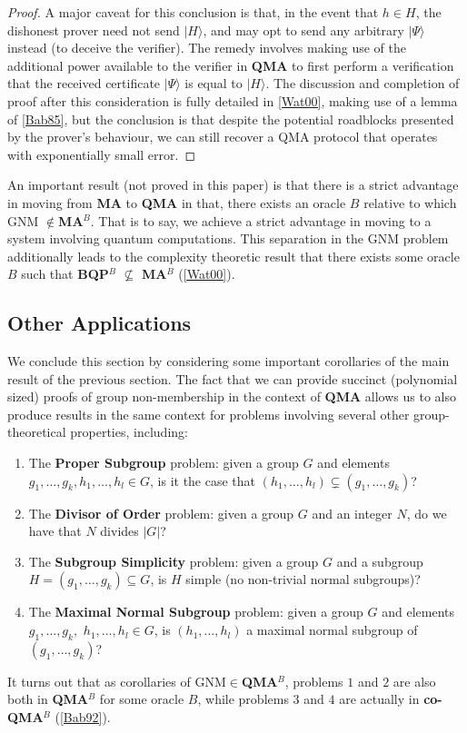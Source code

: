 \documentclass[12pt]{article}
\numberwithin{thm}{section}
\numberwithin{defn}{section}
\numberwithin{prop}{section}
\numberwithin{rmk}{section}
\newcommand{\ket}[1]{\vert #1 \rangle}
\begin{document}
\begin{proof}
		A major caveat for this conclusion is that, in the event that $h\in H$, the dishonest prover need not send $\ket{H}$, and may opt to send any arbitrary $\ket{\Psi}$ instead (to deceive the verifier). The remedy involves making use of the additional power available to the verifier in \textbf{QMA} to first perform a verification that the received certificate $\ket{\Psi}$ is equal to $\ket{H}$. The discussion and completion of proof after this consideration is fully detailed in \hyperref[wat00]{[Wat00]}, making use of a lemma of \hyperref[bab85]{[Bab85]}, but the conclusion is that despite the potential roadblocks presented by the prover's behaviour, we can still recover a QMA protocol that operates with exponentially small error.
	\end{proof}
	An important result (not proved in this paper) is that there is a strict advantage in moving from \textbf{MA} to \textbf{QMA} in that, there exists an oracle $B$ relative to which GNM $\notin$\textbf{MA$^B$}. That is to say, we achieve a strict advantage in moving to a system involving quantum computations. This separation in the GNM problem additionally leads to the complexity theoretic result that there exists some oracle $B$ such that \textbf{BQP$^B$} $\not\subseteq$ \textbf{MA$^B$} (\hyperref[wat00]{[Wat00]}).  
    \subsection{Other Applications}
    We conclude this section by considering some important corollaries of the main result of the previous section. The fact that we can provide succinct (polynomial sized) proofs of group non-membership in the context of \textbf{QMA} allows us to also produce results in the same context for problems involving several other group-theoretical properties, including:
    \begin{enumerate}
    	\item The \textbf{Proper Subgroup} problem: given a group $G$ and elements $g_1,\dots,g_k,h_1,\dots,h_l\in G$, is it the case that $(h_1,\dots,h_l)\subsetneq (g_1,\dots,g_k)$?
    	\item The \textbf{Divisor of Order} problem: given a group $G$ and an integer $N$, do we have that $N$ divides $|G|$?
    	\item The \textbf{Subgroup Simplicity} problem: given a group $G$ and a subgroup $H=(g_1,\dots,g_k)\subseteq G$, is $H$ simple (no non-trivial normal subgroups)?
    	\item  The \textbf{Maximal Normal Subgroup} problem: given a group $G$ and elements $g_1,\dots,g_k,$ $h_1,\dots,h_l\in G$, is $(h_1,\dots,h_l)$ a maximal normal subgroup of $(g_1,\dots,g_k)$? 
    \end{enumerate}
	\indent It turns out that as corollaries of GNM$\in$\textbf{QMA$^B$}, problems $1$ and $2$ are also both in \textbf{QMA$^B$} for some oracle $B$, while problems $3$ and $4$ are actually in \textbf{co-QMA$^B$}  (\hyperref[bab92]{[Bab92]}).
	
\end{document}
